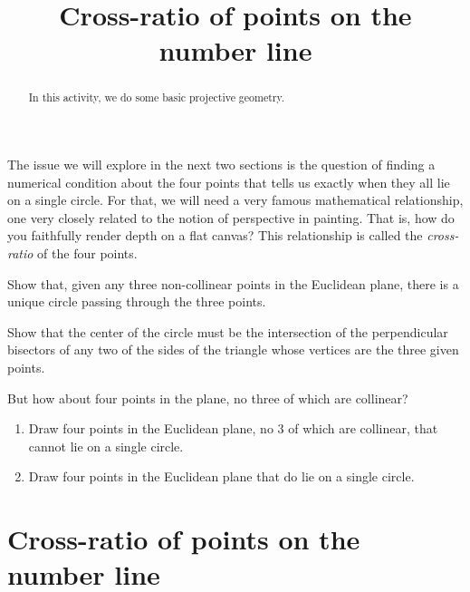 \documentclass{ximera}
\title{Cross-ratio of points on the number line}
\begin{document}
\begin{abstract}
In this activity, we do some basic projective geometry.
\end{abstract}
\maketitle



The issue we will explore in the next two sections is the question of
finding a numerical condition about the four points that tells us
exactly when they all lie on a single circle. For that, we will need a
very famous mathematical relationship, one very closely related to the
notion of perspective in painting. That is, how do you faithfully
render depth on a flat canvas? This relationship is called
the \textit{cross-ratio} of the four points.


\begin{problem}
Show that, given any three non-collinear points in the Euclidean
plane, there is a unique circle passing through the three points.

\begin{hint}
Show that the center of the circle must be the intersection of
the perpendicular bisectors of any two of the sides of the triangle
whose vertices are the three given points.
\end{hint}

\begin{freeResponse}
\end{freeResponse}

\end{problem}

But how about four points in the plane, no three of which are
collinear?

\begin{problem}
\begin{enumerate}\hfil
\item Draw four points in the Euclidean plane, no $3$ of which are collinear, that cannot lie on a single circle.
\item Draw four points in the Euclidean plane that do lie on a single
circle.
\end{enumerate}
\end{problem}



\section*{Cross-ratio of points on the number line}
\end{document}
